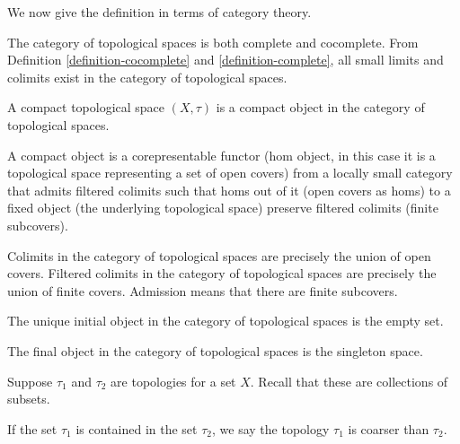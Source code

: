 We now give the definition in terms of category theory.

\begin{remark}
	The category of topological spaces is both complete and cocomplete. From Definition \ref{definition-cocomplete} and \ref{definition-complete}, all small limits and colimits exist in the category of topological spaces.
\end{remark}

\begin{definition}
	\label{definition-compact-topological-space-cat}
	A compact topological space $(X, \tau)$ is a compact object in the category of topological spaces.

	A compact object is a corepresentable functor (hom object, in this case it is a topological space representing a set of open covers) from a locally small category that admits filtered colimits such that homs out of it (open covers as homs) to a fixed object (the underlying topological space) preserve filtered colimits (finite subcovers).
\end{definition}

Colimits in the category of topological spaces are precisely the union of open covers. Filtered colimits in the category of topological spaces are precisely the union of finite covers. Admission means that there are finite subcovers.

\begin{definition}
	The unique initial object in the category of topological spaces is the empty set.
\end{definition}

\begin{definition}
	The final object in the category of topological spaces is the singleton space.
\end{definition}

\begin{definition}[Coarser]
	\label{definition-coarser}
	Suppose $\tau_1$ and $\tau_2$ are topologies for a set $X$.
	Recall that these are collections of subsets.
	
	If the set $\tau_1$ is contained in the set $\tau_2$, we say the topology 
	$\tau_1$ is coarser than $\tau_2$.
\end{definition}

